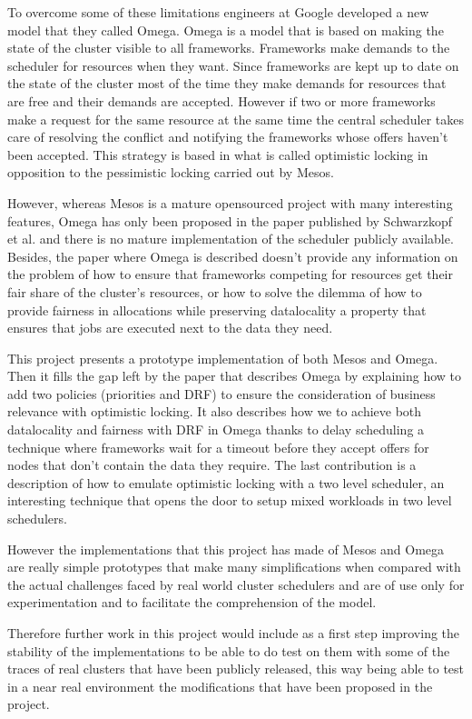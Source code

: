 \documentclass{svjour3}                     %
\begin{document}
To overcome some of these limitations engineers at Google developed a
new model that they called Omega. Omega is a model that is based on
making the state of the cluster visible to all
frameworks. Frameworks make demands to the scheduler for resources
when they want. Since frameworks are kept up to date on the state of
the cluster most of the time they make demands for resources that
are free and their demands are accepted. However if two or more
frameworks make a request for the same resource at the same time the
central scheduler takes care of resolving the conflict and notifying
the frameworks whose offers haven't been accepted. This strategy is
based in what is called optimistic locking in opposition to the
pessimistic locking carried out by Mesos.

However, whereas Mesos is a mature opensourced project with many
interesting features, Omega has only been proposed in the paper
published by Schwarzkopf et al. and there is no mature implementation
of the scheduler publicly available. Besides, the paper where Omega is
described doesn't provide any information on the problem of how to
ensure that frameworks competing for resources get their fair share of
the cluster's resources, or how to solve the dilemma of how to provide
fairness in allocations while preserving datalocality a property that
ensures that jobs are executed next to the data they need.

This project presents a prototype implementation of both Mesos
and Omega. Then it fills the gap left by the paper that
describes Omega by explaining how to add two policies (priorities and
DRF) to ensure the consideration of business relevance with optimistic
locking. It also describes how we to achieve both
datalocality and fairness with DRF in Omega thanks to delay scheduling
a technique where frameworks wait for a timeout before they accept
offers for nodes that don't contain the data they require. The
last contribution is a description of how to emulate optimistic
locking with a two level scheduler, an interesting technique that
opens the door to setup mixed workloads in two level schedulers.

However the implementations that this project has made of Mesos and
Omega are really simple prototypes that make many simplifications when
compared with the actual challenges faced by real world cluster
schedulers and are of use only for experimentation and to facilitate
the comprehension of the model. 

Therefore further work in this project would include as a first step
improving the stability of the implementations to be able to do test
on them with some of the traces of real clusters that have been
publicly released, this way being able to test in a near real
environment the modifications that have been proposed in the project.
\end{document}
